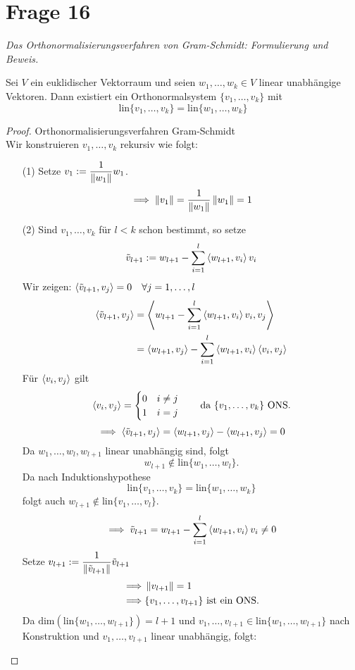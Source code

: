 \section{Frage 16}
\textit{Das Orthonormalisierungsverfahren von Gram-Schmidt: Formulierung und Beweis.}
\begin{theorem}
    Sei $V$ ein euklidischer Vektorraum und seien $w_1,\dots, w_k\in V$ linear unabhängige Vektoren.
    Dann existiert ein Orthonormalsystem $\{v_1,\dots,v_k\}$ mit
    \[
        \mathrm{lin}\{v_1,\dots,v_k\} = \mathrm{lin}\{w_1,\dots,w_k\}
    \]
\end{theorem}
\begin{proof}Orthonormalisierungsverfahren Gram-Schmidt\\
    Wir konstruieren $v_1,\dots,v_k$ rekursiv wie folgt:
    \begin{enumerate}
        \item[(1)] Setze $v_1 := \displaystyle \frac{1}{\left\lVert w_1 \right\rVert} w_1$.
        \[
            \implies \left\lVert v_1 \right\rVert = \frac{1}{\left\lVert w_1 \right\rVert}\left\lVert w_1 \right\rVert = 1
        \]
        \item[(2)] Sind $v_1,\dots,v_k$ für $l < k$ schon bestimmt, so setze
        \[
            \tilde{v}_{l+1} := w_{l+1} - \sum_{i = 1}^{l}\left\langle w_{l+1},v_i \right\rangle v_i
        \]
        Wir zeigen: $\left\langle \tilde{v}_{l+1},v_j \right\rangle=0\quad\forall j = 1,\dots,l$
        \begin{align*}
            \left\langle \tilde{v}_{l+1},v_j \right\rangle &= \left\langle w_{l+1} - \sum_{i=1}^{l}\left\langle w_{l+1},v_i \right\rangle v_i,v_j \right\rangle\\
            &=  \left\langle w_{l+1},v_j \right\rangle - \sum_{i=1}^{l}\left\langle w_{l+1},v_i \right\rangle\left\langle v_i,v_j \right\rangle
        \end{align*}
        Für $\left\langle v_i,v_j \right\rangle$ gilt
        \[
            \left\langle v_i,v_j \right\rangle = \begin{cases}
                0 & i\neq j\\
                1 & i = j
            \end{cases}\qquad \text{da }\{v_1,\dots,v_k\} \text{ ONS}.
        \]
        \[
            \implies \left\langle \tilde{v}_{l+1},v_j \right\rangle = \left\langle w_{l+1},v_j \right\rangle - \left\langle w_{l+1},v_j \right\rangle = 0
        \]
        Da $w_1,\dots,w_l,w_{l+1}$ linear unabhängig sind, folgt
        \[
            w_{l+1}\notin \mathrm{lin}\{w_1,\dots,w_l\}.
        \]
        Da nach Induktionshypothese
        \[
        \mathrm{lin}\{v_1,\dots,v_k\} = \mathrm{lin}\{w_1,\dots,w_k\}
        \]
        folgt auch $w_{l+1} \notin \mathrm{lin}\{v_1,\dots,v_l\}$.
        \[
            \implies \tilde{v}_{l+1} = w_{l+1} - \sum_{i=1}^{l}\left\langle w_{l+1},v_i \right\rangle v_i\neq 0
        \]
        Setze $v_{l+1} := \displaystyle \frac{1}{\left\lVert \tilde{v}_{l+1} \right\rVert}\tilde{v}_{l+1}$
        \begin{align*}
            \implies &\left\lVert v_{l+1} \right\rVert = 1\\
            \implies &\{v_1,\dots,v_{l+1}\} \text{ ist ein ONS.}
        \end{align*}
        Da $\mathrm{dim}(\mathrm{lin}\{w_1,\dots,w_{l+1}\}) = l+1$ und $v_1,\dots,v_{l+1}\in\mathrm{lin}\{w_1,\dots,w_{l+1}\}$
        nach Konstruktion und $v_1,\dots,v_{l+1}$ linear unabhängig, folgt:


\end{enumerate}
\end{proof}
